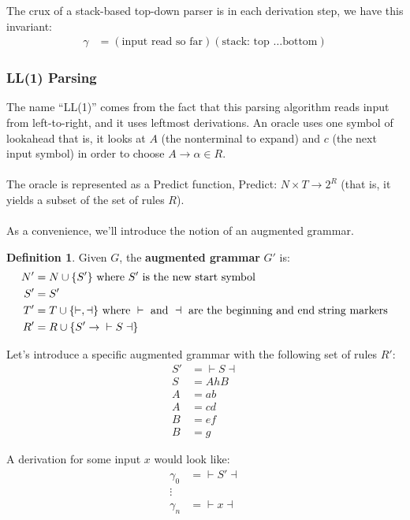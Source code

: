 \documentclass[]{article}
\DeclarePairedDelimiter{\set}{\lbrace}{\rbrace}
\theoremstyle{definition}
\newtheorem*{defn}{Definition}
\newcommand{\lecture}[1]{\marginpar{{\footnotesize $\leftarrow$ \underline{#1}}}}
\begin{document}
				\lecture{March 4, 2013}
				The crux of a stack-based top-down parser is in each derivation step, we have this invariant:
				\begin{align*}
					\gamma &= (\text{input read so far}) (\text{stack: top \ldots bottom})
				\end{align*}

			\subsubsection{LL(1) Parsing}
				The name ``LL(1)'' comes from the fact that this parsing algorithm reads input from left-to-right, and it uses leftmost derivations. An oracle uses one symbol of lookahead \textendash{} that is, it looks at $A$ (the nonterminal to expand) and $c$ (the next input symbol) in order to choose $A \to \alpha \in R$.
				\\ \\
				The oracle is represented as a Predict function, Predict: $N \times T \to 2^R$ (that is, it yields a subset of the set of rules $R$).
				\\ \\
				As a convenience, we'll introduce the notion of an augmented grammar.
				\begin{defn}
					Given $G$, the \textbf{augmented grammar} $G'$ is:
					\begin{align*}
						N' &= N \cup \set{S'} \text{ where } S' \text{ is the new start symbol} \\
						S' &= S' \\
						T' &= T \cup \set{\vdash, \dashv} \text{ where } \vdash \text{ and } \dashv \text{ are the beginning and end string markers} \\
						R' &= R \cup \set{S' \to{} \vdash S \dashv}
					\end{align*}
				\end{defn}

				Let's introduce a specific augmented grammar with the following set of rules $R'$:
				\setcounter{equation}{0}
				\begin{align}
					S' &={} \vdash S \dashv \\
					S &= AhB \\
					A &= ab \\
					A &= cd \\
					B &= ef \\
					B &= g
				\end{align}

				A derivation for some input $x$ would look like:
				\begin{align*}
					\gamma_0 &={} \vdash S' \dashv \\
					\vdots& \\
					\gamma_n &={} \vdash x \dashv
				\end{align*}
\end{document}
